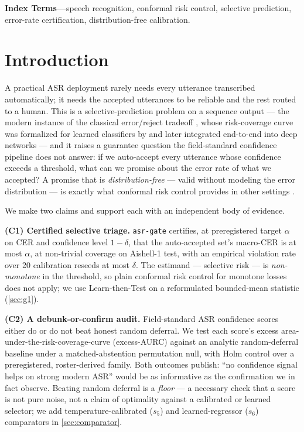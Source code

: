 \documentclass[11pt]{article}
\begin{document}
\vspace{0.3em}
\noindent\textbf{Index Terms---}speech recognition, conformal risk control, selective
prediction, error-rate certification, distribution-free calibration.

\section{Introduction}\label{sec:intro}

A practical ASR deployment rarely needs every utterance transcribed
automatically; it needs the accepted utterances to be reliable and the
rest routed to a human. This is a selective-prediction problem on a sequence
output --- the modern instance of the classical error/reject tradeoff
\citep{chow1970reject}, whose risk-coverage curve was formalized for learned
classifiers by \citet{elyaniv2010foundations} and later integrated end-to-end
into deep networks \citep{geifman2017selective,geifman2019selectivenet,jones2021selective}
--- and it raises a guarantee question the field-standard confidence pipeline does not
answer: if we auto-accept every utterance whose confidence exceeds a threshold,
what can we promise about the error rate of what we accepted? A promise that is
\emph{distribution-free} --- valid without modeling the error distribution --- is
exactly what conformal risk control provides in other settings
\citep{angelopoulos2022crc,bates2021rcps,angelopoulos2023conformal}.

We make two claims and support each with an independent body of evidence.

\textbf{(C1) Certified selective triage.} \texttt{asr-gate} certifies, at
preregistered target $\alpha$ on CER and confidence level $1-\delta$, that the
auto-accepted set's macro-CER is at most $\alpha$, at non-trivial coverage on
Aishell-1 test, with an empirical violation rate over 20 calibration reseeds at
most $\delta$. The estimand --- selective risk --- is \emph{non-monotone} in the
threshold, so plain conformal risk control for monotone losses
\citep{angelopoulos2022crc} does not apply; we use Learn-then-Test
\citep{angelopoulos2021ltt} on a reformulated bounded-mean statistic
(\cref{sec:g1}).

\textbf{(C2) A debunk-or-confirm audit.} Field-standard ASR confidence scores
\citep{li2021confidence} either do or do not beat honest random deferral. We test
each score's excess area-under-the-risk-coverage-curve (excess-AURC) against an
analytic random-deferral baseline under a matched-abstention permutation
null, with Holm control over a preregistered, roster-derived family. Both
outcomes publish: ``no confidence signal helps on strong modern ASR'' would be as
informative as the confirmation we in fact observe. Beating random deferral is a
\emph{floor} --- a necessary check that a score is not pure noise, not a claim of
optimality against a calibrated or learned selector; we add temperature-calibrated
($s_5$) and learned-regressor ($s_6$) comparators in \cref{sec:comparator}.
\end{document}
